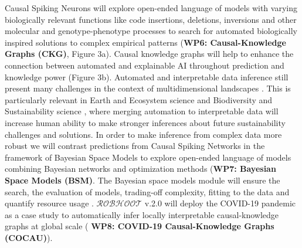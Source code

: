 \documentclass[11pt, a4paper]{article} %
\begin{document}
   Causal Spiking Neurons will explore open-ended language of models
   with varying biologically relevant functions like code insertions,
   deletions, inversions and other molecular and genotype-phenotype
   processes to search for automated biologically inspired solutions
   to complex empirical patterns ({\bf WP6: Causal-Knowledge Graphs
     (CKG)}, Figure 3a). Causal knowledge graphs will help to enhance
   the connection between automated and explainable AI throughout
   prediction and knowledge power (Figure 3b). Automated and
   interpretable data inference still present many challenges in the
   context of multidimensional landscapes
   \citep{OHare2015,Cranmer2019}. This is particularly relevant in
   Earth and Ecosystem science and Biodiversity and Sustainability
   science \citep{Reichstein}, where merging automation to
   interpretable data will increase human ability to make stronger
   inferences about future sustainability challenges and solutions. In
   order to make inference from complex data more robust we will
   contrast predictions from Causal Spiking Networks in the framework
   of Bayesian Space Models to explore open-ended language of models
   combining Bayesian networks and optimization methods ({\bf WP7:
     Bayesian Space Models (BSM)}. The Bayesian space models module
   will ensure the search, the evaluation of models, trading-off
   complexity, fitting to the data and quantify resource usage
   \citep{Guimera2020,Steinruecken}. $\mathcal{ROBHOOT}$ v.2.0 will
   deploy the COVID-19 pandemic as a case study to automatically infer
   locally interpretable causal-knowledge graphs at global scale ({\bf
     WP8: COVID-19 Causal-Knowledge Graphs (COCAU)}).
\end{document}
